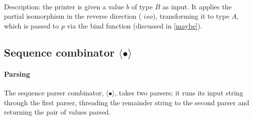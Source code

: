 \documentclass[12pt,a4paper,twoside,openright]{report}
\newcommand{\F}{\AgdaFunction}
\begin{document}
\begin{code}
\> \AgdaSymbol{:} \AgdaSymbol{\{}  \AgdaSymbol{:} \AgdaSymbol{\}}          \<%
\\
\>  \AgdaSymbol{(} \AgdaSymbol{)} \AgdaSymbol{=}     \AgdaSymbol{(} \AgdaSymbol{)}   \AgdaSymbol{)}\<%
\end{code}

Description: the printer is given a value {$b$} of type {$B$} as input. It applies the partial isomorphism in the reverse direction (\F{unapply} $iso$), transforming it to type \F{Maybe} $A$, which is passed to {$p$} via the bind function (discussed in \autoref{maybe}).

\subsection{Sequence combinator $\langle\bullet\rangle$}

\paragraph{Parsing}
{The sequence parser combinator, $\langle\bullet\rangle$, takes two parsers; it runs its input string through the first parser, threading the remainder string to the second parser and returning the pair of values parsed}.

\begin{code}
\> \AgdaSymbol{:} \AgdaSymbol{\{}  \AgdaSymbol{:} \AgdaSymbol{\}}         \AgdaSymbol{(}  \AgdaSymbol{)}\<%
\\
\>     \AgdaSymbol{=}  \>[44]   \AgdaSymbol{(} \AgdaSymbol{)} \<[59]%
\>[59]   \<%
\\
\>[4]\<[44]%
\>[44]\AgdaSymbol{(} \AgdaSymbol{(} \AgdaSymbol{))} \>[59]   \<%
\\
\>[4]\<[44]%
\>[44]\AgdaFunction{[} \AgdaSymbol{((} \AgdaSymbol{)} \AgdaInductiveConstructor{,}  \AgdaSymbol{)} \AgdaInductiveConstructor{,}   \AgdaFunction{]}\AgdaSymbol{)))}\<%
\end{code}
\end{document}
